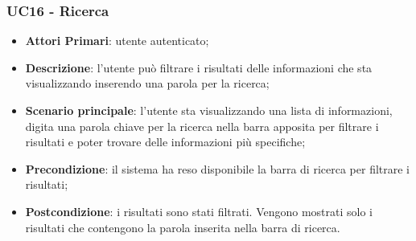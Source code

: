 \subsubsection{UC16 - Ricerca}
\begin{itemize}
	\item \textbf{Attori Primari}: utente autenticato;
	\item \textbf{Descrizione}: l'utente può filtrare i risultati delle informazioni che sta visualizzando inserendo una parola per la ricerca;
	\item \textbf{Scenario principale}: l'utente sta visualizzando una lista di informazioni, digita una parola chiave per la ricerca nella barra apposita per filtrare i risultati e poter trovare delle informazioni più specifiche;
	\item \textbf{Precondizione}: il sistema ha reso disponibile la barra di ricerca per filtrare i risultati;
	\item \textbf{Postcondizione}: i risultati sono stati filtrati. Vengono mostrati solo i risultati che contengono la parola inserita nella barra di ricerca.
\end{itemize} 
